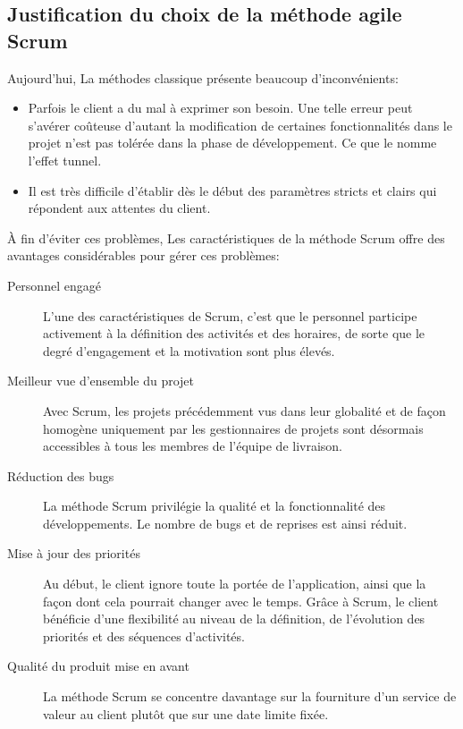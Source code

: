 \subsection{Justification du choix de la méthode agile Scrum}

Aujourd'hui, La méthodes classique présente beaucoup d'inconvénients:

\begin{itemize}
    \item Parfois le client a du mal à exprimer son besoin. Une telle erreur
        peut s'avérer coûteuse d'autant la modification de certaines
        fonctionnalités dans le projet n'est pas tolérée dans la phase de
        développement. Ce que le nomme l'effet tunnel.
    \item Il est très difficile d'établir dès le début des paramètres stricts
        et clairs qui répondent aux attentes du client.
\end{itemize}

À fin d'éviter ces problèmes, Les caractéristiques de la méthode Scrum offre
des avantages considérables pour gérer ces problèmes:

\begin{description}
    \item [Personnel engagé] L'une des caractéristiques de Scrum, c'est que le
        personnel participe activement à la définition des activités et des
        horaires, de sorte que le degré d'engagement et la motivation sont plus
        élevés.
    \item [Meilleur vue d'ensemble du projet] Avec Scrum, les projets
        précédemment vus dans leur globalité et de façon homogène uniquement
        par les gestionnaires de projets sont désormais accessibles à tous les
        membres de l'équipe de livraison.
    \item [Réduction des bugs] La méthode Scrum privilégie la qualité et la
        fonctionnalité des développements. Le nombre de bugs et de reprises est
        ainsi réduit.
    \item [Mise à jour des priorités] Au début, le client ignore toute la
        portée de l'application, ainsi que la façon dont cela pourrait changer
        avec le temps. Grâce à Scrum, le client bénéficie d'une flexibilité au
        niveau de la définition, de l'évolution des priorités et des séquences
        d'activités.
    \item [Qualité du produit mise en avant] La méthode Scrum se concentre
        davantage sur la fourniture d'un service de valeur au client plutôt que
        sur une date limite fixée.
\end{description}

